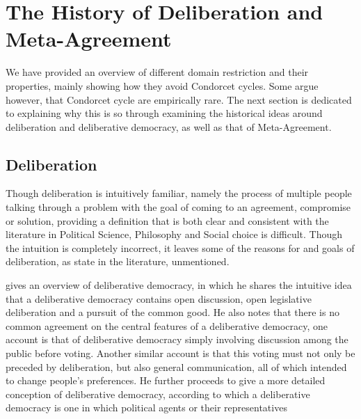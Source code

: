 \section{The History of Deliberation and Meta-Agreement}

We have provided an overview of different domain restriction and their properties, mainly showing how they avoid Condorcet cycles. Some argue however, that Condorcet cycle are empirically rare. The next section is dedicated to explaining why this is so through examining the historical ideas around deliberation and deliberative democracy, as well as that of Meta-Agreement.

\subsection{Deliberation}
Though deliberation is intuitively familiar, namely the process of multiple people talking through a problem with the goal of coming to an agreement, compromise or solution, providing a definition that is both clear and consistent with the literature in Political Science, Philosophy and Social choice is difficult. Though the intuition is completely incorrect, it leaves some of the reasons for and goals of deliberation, as state in the literature, unmentioned.


\citet{freemanDeliberativeDemocracySympathetic2000} gives an overview of deliberative democracy, in which he shares the intuitive idea that a deliberative democracy contains open discussion, open legislative deliberation and a pursuit of the common good. He also notes that there is no common agreement on the central features of a deliberative democracy, one account is that of deliberative democracy simply involving discussion among the public before voting. Another similar account is that this voting must not only be preceded by deliberation, but also general communication, all of which intended to change people's preferences. He further proceeds to give a more detailed conception of deliberative democracy, according to which a deliberative democracy is one in which political agents or their representatives

